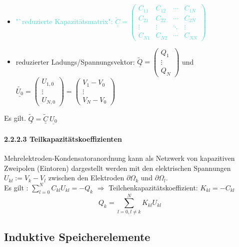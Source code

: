 \documentclass[]{article}
\newcommand{\C}{\ensuremath{\mathbb C}}
\newcommand{\Q}{\ensuremath{\mathbb Q}}
\begin{document}
	\begin{itemize}
		\item 
			\textcolor{Turquoise}{"`reduzierte Kapazitätsmatrix": $\underline{\underline{\tilde{C}}}=\begin{pmatrix}C_{11}&C_{12}&\dotsm&C_{1N}\\C_{21}&C_{22}&\dotsm&C_{2N}\\\vdots&\vdots&\ddots&\vdots\\C_{N1}&C_{N2}&\dotsm&C_{NN}\end{pmatrix}$}
		\item 
			reduzierter Ladungs/Spannungsvektor: 
			$\underline{\tilde{Q}}=\begin{pmatrix}Q_1\\\vdots\\Q_N\end{pmatrix}$
			 und 
			$\underline{\tilde{U_0}}=
			\begin{pmatrix}
				U_{1,0}\\\vdots\\U_{N,0}
			\end{pmatrix}=
			\begin{pmatrix}
				V_1-V_0\\\vdots\\V_N-V_0
			\end{pmatrix}$
	\end{itemize}

	Es gilt. $\underline{\tilde{Q}}=\underline{\underline{\tilde{C}}} \ \underline{U_0}$

\paragraph{2.2.2.3 Teilkapazitätskoeffizienten}
	Mehrelektroden-Kondensatoranordnung kann als Netzwerk von kapazitiven Zweipolen (Eintoren) dargestellt werden mit den elektrischen Spannungen $U_{kl}:=V_k-V_l$ zwischen den Elektroden $∂\Omega_k$ und $∂\Omega_l$. 
	\\Es gilt : $\sum\limits_{l=0}^{N}C_{kl}U_{kl}=-Q_k$ $\Rightarrow$ Teilchenkapazitätskoeffizient: $K_{kl}=-C_{kl}$
	$$Q_k=\sum\limits_{l=0,l\not=k}^{N}K_{kl}U_{kl}$$

\subsection{Induktive Speicherelemente}
\end{document}
